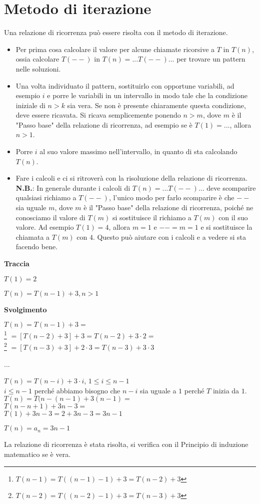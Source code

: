 \section{Metodo di iterazione}
Una relazione di ricorrenza può essere risolta con il metodo di iterazione.
\begin{itemize}
    \item Per prima cosa calcolare il valore per alcune chiamate ricorsive a $T$ in $T(n)$, ossia calcolare $T(--)$ in $T(n) = ... T(--) ...$ per trovare un pattern nelle soluzioni.
    \item Una volta individuato il pattern, sostituirlo con opportune variabili, ad esempio $i$ e porre le variabili in un intervallo in modo tale che la condizione iniziale di $n > k$ sia vera. Se non è presente chiaramente questa condizione, deve essere ricavata. Si ricava semplicemente ponendo $n > m$, dove $m$ è il "Passo base" della relazione di ricorrenza, ad esempio se è $T(1) = ...$, allora $n > 1$.
    \item Porre $i$ al suo valore massimo nell'intervallo, in quanto di sta calcolando $T(n)$.
    \item Fare i calcoli e ci si ritroverà con la risoluzione della relazione di ricorrenza. \\
    \textbf{N.B.}: In generale durante i calcoli di $T(n) = ... T(--) ...$ deve scomparire qualsiasi richiamo a $T(--)$, l'unico modo per farlo scomparire è che $--$ sia uguale $m$, dove $m$ è il "Passo base" della relazione di ricorrenza, poiché ne conosciamo il valore di $T(m)$ si sostituisce il richiamo a $T(m)$ con il suo valore. Ad esempio $T(1) = 4$, allora $m=1$ e $-- = m = 1$ e si sostituisce la chiamata a $T(m)$ con $4$. Questo può aiutare con i calcoli e a vedere si sta facendo bene.
\end{itemize}

\begin{example}
\phantom{}
\centerline{\textbf{Traccia}}

$T(1) = 2$

$T(n) = T(n - 1) + 3, n > 1$

\centerline{\textbf{Svolgimento}}
$T(n) = T(n - 1) + 3 =$ \\ \footnote{$T(n-1)=T((n-1)-1)+3=T(n-2)+3$}
$=[T(n-2)+3]+3=T(n-2)+3 \cdot 2 =$ \\ \footnote{$T(n-2)=T((n-2)-1)+3=T(n-3)+3$}
$=[T(n-3)+3]+2 \cdot 3=T(n-3)+3 \cdot 3$

...

$T(n) = T(n - i) + 3 \cdot i$, $1 \le i \le n - 1$ \\
$i \le n - 1$ perché abbiamo bisogno che $n - i$ sia uguale a $1$ perché $T$ inizia da $1$. \\
$T(n) = T(n -(n - 1) + 3(n - 1) =$ \\ 
$T(n - n + 1) + 3n - 3 =$ \\
$T(1) + 3n - 3 = 2 + 3n - 3 = 3n - 1$

$T(n) = a_n = 3n - 1$

La relazione di ricorrenza è stata risolta, si verifica con il Principio di induzione matematico se è vera.
\end{example}

